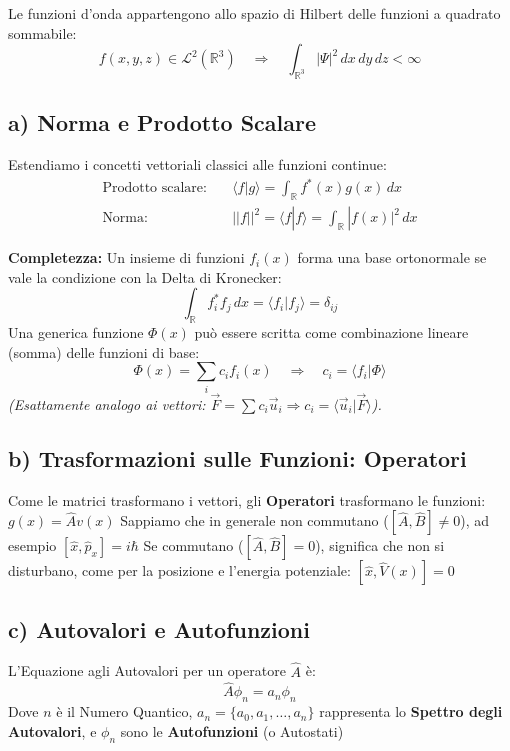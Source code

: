 \documentclass[11pt, a4paper]{article}
\begin{document}
Le funzioni d'onda appartengono allo spazio di Hilbert delle funzioni a quadrato sommabile: %
\begin{equation*}
    f(x,y,z) \in \mathcal{L}^2(\mathbb{R}^3) \quad \Rightarrow \quad \int_{\mathbb{R}^3} |\Psi|^2 \, dx \, dy \, dz < \infty %
\end{equation*}

\subsection{a) Norma e Prodotto Scalare} %
Estendiamo i concetti vettoriali classici alle funzioni continue: %
\begin{align*}
    \text{Prodotto scalare:} \quad & \langle f | g \rangle = \int_{\mathbb{R}} f^*(x) g(x) \, dx \\ %
    \text{Norma:} \quad & ||f||^2 = \langle f | f \rangle = \int_{\mathbb{R}} |f(x)|^2 \, dx %
\end{align*}

\noindent
\textbf{Completezza:} Un insieme di funzioni $f_i(x)$ forma una base ortonormale se vale la condizione con la Delta di Kronecker: %
\begin{equation*}
    \int_{\mathbb{R}} f_i^* f_j \, dx = \langle f_i | f_j \rangle = \delta_{ij} %
\end{equation*}
Una generica funzione $\Phi(x)$ può essere scritta come combinazione lineare (somma) delle funzioni di base: %
\begin{equation*}
    \Phi(x) = \sum_i c_i f_i(x) \quad \Rightarrow \quad c_i = \langle f_i | \Phi \rangle %
\end{equation*}
\textit{(Esattamente analogo ai vettori: $\vec{F} = \sum c_i \vec{u}_i \Rightarrow c_i = \langle \vec{u}_i | \vec{F} \rangle$).} %

\subsection{b) Trasformazioni sulle Funzioni: Operatori} %
Come le matrici trasformano i vettori, gli \textbf{Operatori} trasformano le funzioni: $g(x) = \hat{A}v(x)$ %
Sappiamo che in generale non commutano ($[\hat{A}, \hat{B}] \neq 0$), ad esempio $[\hat{x}, \hat{p}_x] = i\hbar$ %
Se commutano ($[\hat{A}, \hat{B}] = 0$), significa che non si disturbano, come per la posizione e l'energia potenziale: $[\hat{x}, \hat{V}(x)] = 0$ %

\subsection{c) Autovalori e Autofunzioni} %
L'Equazione agli Autovalori per un operatore $\hat{A}$ è: %
\begin{equation}
    \hat{A} \phi_n = a_n \phi_n %
\end{equation}
Dove $n$ è il Numero Quantico, $a_n = \{a_0, a_1, \dots, a_n\}$ rappresenta lo \textbf{Spettro degli Autovalori}, e $\phi_n$ sono le \textbf{Autofunzioni} (o Autostati) %
\end{document}
